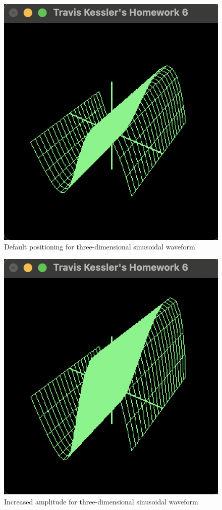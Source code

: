 \documentclass{report}
\begin{document}
	\begin{figure}[!ht]
		\centering
		\includegraphics[scale=0.7, trim={0 0.05cm 0 0.0cm}, clip]{figures/3d_base.png}
		\caption{Default positioning for three-dimensional sinusoidal waveform}
	\end{figure}
	
	\begin{figure}[!ht]
		\centering
		\includegraphics[scale=0.7, trim={0 0.05cm 0 0.0cm}, clip]{figures/3d_u.png}
		\caption{Increased amplitude for three-dimensional sinusoidal waveform}
	\end{figure}
	
\end{document}

